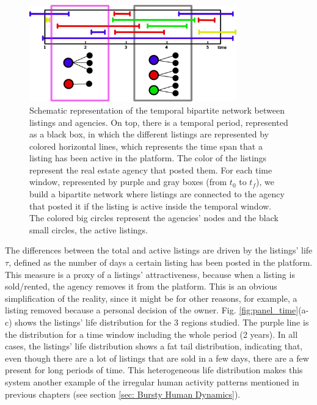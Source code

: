 \begin{figure}
    \vspace{0.2 cm}
    \centering
    \includegraphics[width = 0.8\textwidth]{Figs/Idealista_dynamics/temporal_bipartite.pdf}
	\caption[Housing market as a temporal bipartite network.]{Schematic representation of the temporal bipartite network between listings and agencies. On top, there is a temporal period, represented as a black box, in which the different listings are represented by colored horizontal lines, which represents the time span that a listing has been active in the platform. The color of the listings represent the real estate agency that posted them. For each time window, represented by purple and gray boxes (from $t_0$ to $t_f$), we build a bipartite network where listings are connected to the agency that posted it if the listing is active inside the temporal window. The colored big circles represent the agencies' nodes and the black small circles, the active listings. \label{fig:temporal_bipartite}}
\end{figure}

The differences between the total and active listings are driven by the listings' life $\tau$, defined as the number of days a certain listing has been posted in the platform. This measure is a proxy of a listings' attractiveness, because when a listing is sold/rented, the agency removes it from the platform. This is an obvious simplification of the reality, since it might be for other reasons, for example, a listing removed because a personal decision of the owner. Fig. \ref{fig:panel_time}(a-c) shows the listings' life distribution for the 3 regions studied. The purple line is the distribution for a time window including the whole period (2 years). In all cases, the listings' life distribution shows a fat tail distribution, indicating that, even though there are a lot of listings that are sold in a few days, there are a few present for long periods of time. This heterogeneous life distribution makes this system another example of the irregular human activity patterns mentioned in previous chapters (see section \ref{sec: Bursty Human Dynamics}).


